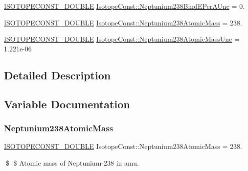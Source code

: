 \begin{DoxyCompactItemize}
\mbox{\hyperlink{group___isotope_const-_macros_ga8f45a7272ce02c0b4c65c44636ed719a}{I\+S\+O\+T\+O\+P\+E\+C\+O\+N\+S\+T\+\_\+\+D\+O\+U\+B\+LE}} \mbox{\hyperlink{group___isotope_const-_neptunium-_np238_ga85de26a5c5880499591e86c7f4015169}{Isotope\+Const\+::\+Neptunium238\+Bind\+E\+Per\+A\+Unc}} = 0.
\item 
\mbox{\hyperlink{group___isotope_const-_macros_ga8f45a7272ce02c0b4c65c44636ed719a}{I\+S\+O\+T\+O\+P\+E\+C\+O\+N\+S\+T\+\_\+\+D\+O\+U\+B\+LE}} \mbox{\hyperlink{group___isotope_const-_neptunium-_np238_gaaf82edb2e4cc0fc367a2f10cc8cab650}{Isotope\+Const\+::\+Neptunium238\+Atomic\+Mass}} = 238.
\item 
\mbox{\hyperlink{group___isotope_const-_macros_ga8f45a7272ce02c0b4c65c44636ed719a}{I\+S\+O\+T\+O\+P\+E\+C\+O\+N\+S\+T\+\_\+\+D\+O\+U\+B\+LE}} \mbox{\hyperlink{group___isotope_const-_neptunium-_np238_gab0b9c30ae647a16261ae0b1b2fe593fc}{Isotope\+Const\+::\+Neptunium238\+Atomic\+Mass\+Unc}} = 1.\+221e-\/06
\end{DoxyCompactItemize}


\subsection{Detailed Description}


\subsection{Variable Documentation}
\mbox{\label{group___isotope_const-_neptunium-_np238_gaaf82edb2e4cc0fc367a2f10cc8cab650}} 
\subsubsection{\texorpdfstring{Neptunium238\+Atomic\+Mass}{Neptunium238AtomicMass}}
{\footnotesize\ttfamily \mbox{\hyperlink{group___isotope_const-_macros_ga8f45a7272ce02c0b4c65c44636ed719a}{I\+S\+O\+T\+O\+P\+E\+C\+O\+N\+S\+T\+\_\+\+D\+O\+U\+B\+LE}} Isotope\+Const\+::\+Neptunium238\+Atomic\+Mass = 238.}

\$ \$ Atomic mass of Neptunium-\/238 in amu. \mbox{\label{group___isotope_const-_neptunium-_np238_gab0b9c30ae647a16261ae0b1b2fe593fc}} 
